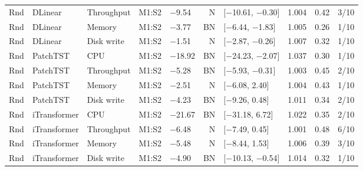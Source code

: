 \begin{longtable}{@{}lllllrlrrr@{}}
Rnd & DLinear & Throughput & M1:S2 & $-$9.54 & N & [$-$10.61, $-$0.30] & 1.004 & 0.42 & 3/10 \\
Rnd & DLinear & Memory & M1:S2 & $-$3.77 & BN & [$-$6.44, $-$1.83] & 1.005 & 0.26 & 1/10 \\
Rnd & DLinear & Disk write & M1:S2 & $-$1.51 & N & [$-$2.87, $-$0.26] & 1.007 & 0.32 & 1/10 \\
Rnd & PatchTST & CPU & M1:S2 & $-$18.92 & BN & [$-$24.23, $-$2.07] & 1.037 & 0.30 & 1/10 \\
Rnd & PatchTST & Throughput & M1:S2 & $-$5.28 & BN & [$-$5.93, $-$0.31] & 1.003 & 0.45 & 2/10 \\
Rnd & PatchTST & Memory & M1:S2 & $-$2.51 & N & [$-$6.08, 2.40] & 1.004 & 0.43 & 1/10 \\
Rnd & PatchTST & Disk write & M1:S2 & $-$4.23 & BN & [$-$9.26, 0.48] & 1.011 & 0.34 & 2/10 \\
Rnd & iTransformer & CPU & M1:S2 & $-$21.67 & BN & [$-$31.18, 6.72] & 1.022 & 0.35 & 2/10 \\
Rnd & iTransformer & Throughput & M1:S2 & $-$6.48 & N & [$-$7.49, 0.45] & 1.001 & 0.48 & 6/10 \\
Rnd & iTransformer & Memory & M1:S2 & $-$5.48 & N & [$-$8.44, 1.53] & 1.006 & 0.39 & 3/10 \\
Rnd & iTransformer & Disk write & M1:S2 & $-$4.90 & BN & [$-$10.13, $-$0.54] & 1.014 & 0.32 & 1/10 \\
\end{longtable}
\normalsize\setlength{\tabcolsep}{4pt}

